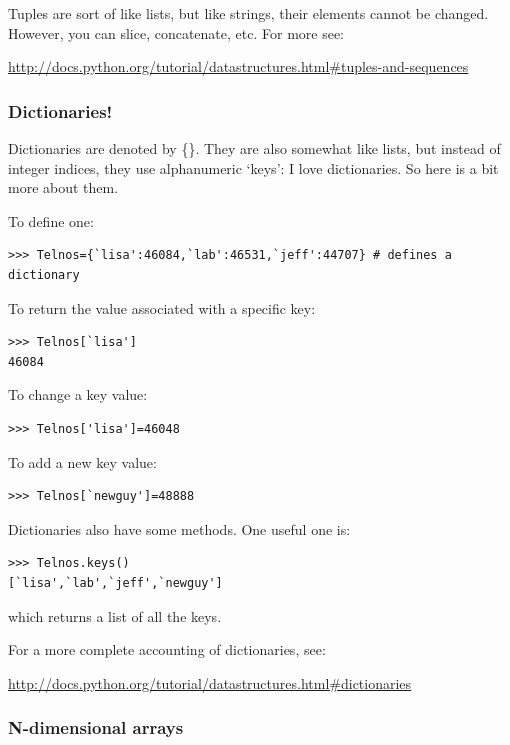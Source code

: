 \documentclass[11pt]{book}
\begin{document}
{{\noindent Tuples are sort of like lists, but like strings, their elements cannot be changed.  However, you can slice, concatenate, etc.
 For more see:

\url{ http://docs.python.org/tutorial/datastructures.html#tuples-and-sequences}




\subsubsection {Dictionaries!}

Dictionaries are denoted by \{\}.  They are also somewhat like lists, but instead of integer indices, they use alphanumeric `keys':
I love dictionaries.  So here is a bit more about them.

\noindent
To define one:
{ \color{blue} \begin{verbatim}
>>> Telnos={`lisa':46084,`lab':46531,`jeff':44707} # defines a dictionary
\end{verbatim}}

\noindent
To return the value associated with a specific key:
{ \color{blue} \begin{verbatim}
>>> Telnos[`lisa']
46084
\end{verbatim}}

\noindent
 To change a key value:

{ \color{blue} \begin{verbatim}
>>> Telnos['lisa']=46048
\end{verbatim}}


\noindent
To add a new key value:
{ \color{blue} \begin{verbatim}
>>> Telnos[`newguy']=48888
\end{verbatim}}


\noindent
 Dictionaries also have some methods.
One useful one is:
{ \color{blue} \begin{verbatim}
>>> Telnos.keys()
[`lisa',`lab',`jeff',`newguy']
\end{verbatim}}

\noindent
which returns a list of all the keys.

For a more complete accounting of dictionaries,  see:

\url{http://docs.python.org/tutorial/datastructures.html#dictionaries}



\subsubsection{N-dimensional arrays}

}}
\end{document}
